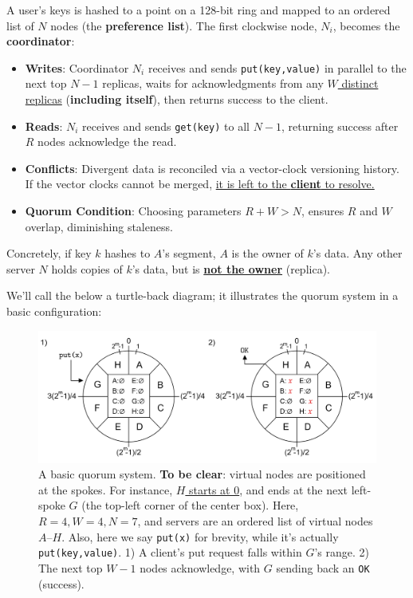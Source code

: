   \begin{Def}

    A user's keys is hashed to a point on a 128-bit ring and mapped to an ordered list of $N$ nodes (the \textbf{preference list}). The first clockwise node, $N_i$, becomes the \textbf{coordinator}:
      
        \begin{itemize}
          \item \textbf{Writes}: Coordinator $N_i$ receives and sends \texttt{put(key,value)} in parallel to the next top $N-1$ replicas, waits for acknowledgments from any \underline{$W$ distinct replicas} (\textbf{including itself}), then returns success to the client.
          \item \textbf{Reads}: $N_i$ receives and sends \texttt{get(key)} to all $N-1$, returning success after $R$ nodes acknowledge the read. 
          \item \textbf{Conflicts}: Divergent data is reconciled via a vector-clock versioning history. If the vector clocks cannot be merged, \underline{it is left to the \textbf{client} to resolve.}
          \item \textbf{Quorum Condition}: Choosing parameters $R + W > N$, ensures $R$ and $W$ overlap, diminishing staleness.
        \end{itemize}

        \noindent
        Concretely, if key $k$ hashes to $A$'s segment, $A$ is the owner of $k$'s data. Any other server $N$ holds copies of $k$'s data, but is \underline{\textbf{not the owner}} (replica).
      \end{Def}
      
    
    \newpage 
    \noindent
    We'll call the below a turtle-back diagram; it illustrates the quorum system in a basic configuration:
    \begin{figure}[h]
        
        \centering
        \includegraphics[width=\textwidth]{Sections/dyn/gossip.png}
        \caption{A basic quorum system. \textbf{To be clear}: virtual nodes are positioned at the spokes. For instance, \underline{$H$ starts at 0}, and ends at the next left-spoke $G$ (the top-left corner of the center box). Here, $R=4, W=4, N=7$, and servers are 
        an ordered list of virtual nodes $A$--$H$. Also, here we say \texttt{put(x)} for brevity, while it's actually \texttt{put(key,value)}.
        1) A client's put request falls within $G$'s range. 2) The next top $W-1$ nodes acknowledge, with $G$ sending back an \texttt{OK} (success).}
        \label{fig:quorum}
    \end{figure}

